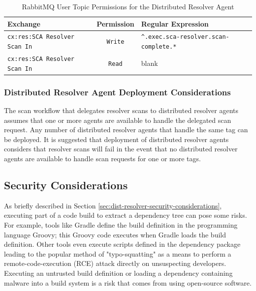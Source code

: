 \begin{table}[ht]
  \caption{RabbitMQ User Topic Permissions for the Distributed Resolver Agent}  
  \label{tab:agent-mq-topic-perms}      
  \begin{tabularx}{\textwidth}{lcl}
      \toprule
      \textbf{Exchange} & \textbf{Permission} & \textbf{Regular Expression} \\
      \midrule
      \texttt{cx:res:SCA Resolver Scan In} & \texttt{Write} & \texttt{\^{}.exec.sca-resolver.scan-complete.*}\\
      \midrule
      \texttt{cx:res:SCA Resolver Scan In} & \texttt{Read} & blank \\
      \midrule
      \bottomrule
  \end{tabularx}
\end{table}

\subsubsection{Distributed Resolver Agent Deployment Considerations}

The \cxoneflow scan workflow that delegates resolver scans to distributed resolver agents
assumes that one or more agents are available to handle the delegated scan request. Any number
of distributed resolver agents that handle the same tag can be deployed.  It is suggested that
deployment of distributed resolver agents considers that resolver scans will fail in the event
that no distributed resolver agents are available to handle scan requests for one or more
tags.


\subsection{Security Considerations}\label{sec:resolver-agent-security}

As briefly described in Section \ref{sec:dist-resolver-security-considerations}, executing
part of a code build to extract a dependency tree can pose some risks. For example,
tools like Gradle define the build definition in the programming language Groovy; this Groovy
code executes when Gradle loads the build definition.  Other tools even execute scripts defined
in the dependency package leading to the popular method of "typo-squatting" as a means to
perform a remote-code-execution (RCE) attack directly on unsuspecting developers.  Executing an
untrusted build definition or loading a dependency containing malware into a build system is
a risk that comes from using open-source software.

